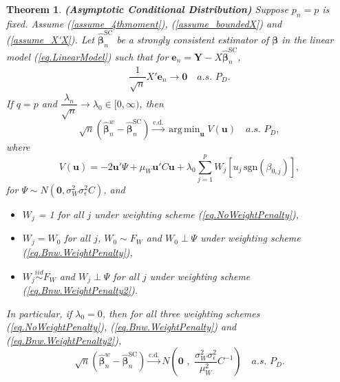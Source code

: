 \documentclass[ejs,authoryear,linksfromyear]{imsart}
\DeclareMathOperator*{\argmin}{arg\,min} %
\newcommand{\CONV}[1]{\stackrel{\text{#1}}{\longrightarrow}} %
\newcommand{\bnw}{\widehat{\bm{\beta}}_n^w} %
\newcommand{\bSC}{\widehat{\bm{\beta}}_n^{\text{SC}}} %
\numberwithin{equation}{section}
\theoremstyle{plain}
\newtheorem{thm}{Theorem}[section]
\begin{document}
\begin{thm} \label{thm_low_AsympDistn}
	\textbf{(Asymptotic Conditional Distribution)} Suppose $p_n = p$ is fixed. Assume (\ref{assume_4thmoment}), (\ref{assume_boundedX}) and (\ref{assume_X'X}). Let $\bSC$ be a strongly consistent estimator of $\bm{\beta}$ in the linear model (\ref{eq.LinearModel}) such that for $\bm{e}_n = \bm{Y} - X \bSC$,
	\begin{align} \label{assume:X'e}
	\dfrac{1}{\sqrt{n}} X' \bm{e}_n 
	\to \bm{0} 
	\quad a.s. \,\, P_D.
	\end{align}
	If $q = p$ and $\dfrac{\lambda_n}{\sqrt{n}} \to \lambda_0 \in [0,\infty)$, then
	$$
	\sqrt{n} \left( 
		\bnw - \bSC
	\right) 
	\CONV{c.d.} 
	\argmin_{\bm{u}} V (\bm{u})
	\quad a.s. \,\, P_D,
	$$
	where
	$$ 
	V(\bm{u}) = -2 \bm{u}' \Psi + \mu_W \bm{u}' C \bm{u} 
	+ \lambda_0 \sum_{j=1}^p W_j
	\left[ u_j \, \text{sgn}(\beta_{0,j}) \right],
	$$
	for $\Psi \sim N \left( \bm{0} , \sigma^2_W \sigma^2_{\epsilon} C \right)$, and
	\begin{itemize}
		\item [(i)] $W_j$ = 1 for all $j$ under weighting scheme (\ref{eq.NoWeightPenalty}),
		\item [(ii)] $W_j = W_0$ for all $j$, $W_0 \sim F_W$ and $W_0 \perp \Psi$ under weighting scheme (\ref{eq.Bnw.WeightPenalty}), 
		\item [(iii)] $W_j \stackrel{iid}{\sim} F_W$ and $W_j \perp \Psi$ for all $j$ under weighting scheme (\ref{eq.Bnw.WeightPenalty2}).
	\end{itemize} 
	In particular, if $\lambda_0 = 0$, then for all three weighting schemes (\ref{eq.NoWeightPenalty}), (\ref{eq.Bnw.WeightPenalty}) and (\ref{eq.Bnw.WeightPenalty2}),
	$$
	\sqrt{n} \left( 
	\bnw - \bSC
	\right) 
	\CONV{c.d.} 
	N \left( 
		\bm{0} \,\, , \,\, 
		\dfrac{ \sigma^2_W \sigma^2_{\epsilon} }{\mu_W^2} C^{-1} 
	\right)
	\quad a.s. \,\, P_D.
	$$	 
\end{thm}   
\end{document}
